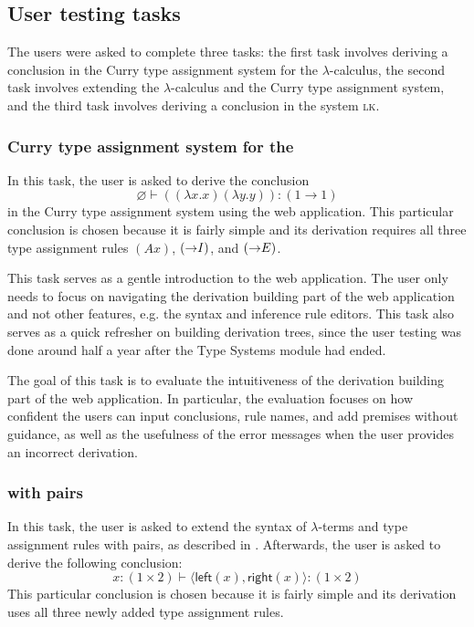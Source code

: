 \subsection{User testing tasks}
The users were asked to complete three tasks: the first task involves deriving a conclusion in the Curry type assignment system for the $\lambda$-calculus, the second task involves extending the $\lambda$-calculus and the Curry type assignment system, and the third task involves deriving a conclusion in the system \textsc{lk}.

\subsubsection{Curry type assignment system for the \lc{}}
In this task, the user is asked to derive the conclusion
\[
    \varnothing \vdash ((\lambda x. x)(\lambda y. y)): (1 \to 1)
\]
in the Curry type assignment system using the web application. This particular conclusion is chosen because it is fairly simple and its derivation requires all three type assignment rules $(Ax)$, $(\mathord{\to} I)$, and $(\mathord{\to} E)$.

This task serves as a gentle introduction to the web application. The user only needs to focus on navigating the derivation building part of the web application and not other features, e.g. the syntax and inference rule editors. This task also serves as a quick refresher on building derivation trees, since the user testing was done around half a year after the Type Systems module had ended.

The goal of this task is to evaluate the intuitiveness of the derivation building part of the web application. In particular, the evaluation focuses on how confident the users can input conclusions, rule names, and add premises without guidance, as well as the usefulness of the error messages when the user provides an incorrect derivation.

\subsubsection{\lc{} with pairs}
In this task, the user is asked to extend the syntax of $\lambda$-terms and type assignment rules with pairs, as described in . Afterwards, the user is asked to derive the following conclusion:
\[
    x: (1 \times 2) \vdash \langle \textsf{left}(x), \textsf{right}(x) \rangle: (1 \times 2)
\]
This particular conclusion is chosen because it is fairly simple and its derivation uses all three newly added type assignment rules.

